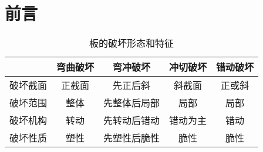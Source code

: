 \documentclass[UTF8,a4paper,12pt]{ctexart}
\numberwithin{equation}{section}
\newcommand{\wuhao}{\fontsize{10.5pt}{\baselineskip}\selectfont}
\begin{document}

\clearpage
\newcommand\nbvspace[1][3]{\vspace*{\stretch{#1}}}
\newcommand\nbstretchyspace{\spaceskip0.5em plus 0.25em minus 0.25em}
\newcommand{\nbtitlestretch}{\spaceskip0.6em}
\pagestyle{empty}

\newpage
\pagestyle{empty}
\fancyhead{}


\newpage
\pagestyle{plain}
\setcounter{page}{1}

\section{前言}






\begin{table}[htbp!]
	\centering
	\caption{板的破坏形态和特征}
	\begin{tabular}{ccccc}
		\toprule[1pt]
		& 弯曲破坏  & 弯冲破坏  & 冲切破坏  & 错动破坏 \\
		\hline
		破坏截面  & 正截面   & 先正后斜  & 斜截面   & 正或斜 \\
		破坏范围  & 整体    & 先整体后局部 & 局部    & 局部 \\
		破坏机构  & 转动    & 先转动后错动 & 错动为主  & 错动 \\
		破坏性质  & 塑性    & 先塑性后脆性 & 脆性    & 脆性 \\
		\bottomrule[1pt]
	\end{tabular}%
\end{table}%
\vspace{-0.5cm}
\begin{comment}

\end{comment}

\newpage
\wuhao

\end{document}
